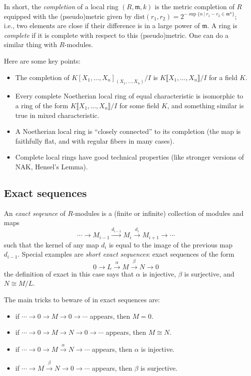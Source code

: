 \documentclass[12pt]{amsart}
\newcommand{\m}{\mathfrak{m}}
\begin{document}
In short, the \emph{completion} of a local ring $(R,\m,k)$ is the metric completion of $R$ equipped with the (pseudo)metric given by $\mathrm{dist}(r_1,r_2) = 2^{- \sup\{ n \ | \ r_1-r_2 \in \m^{n}\}}$; i.e., two elements are close if their difference is in a large power of $\m$. A ring is \emph{complete} if it is complete with respect to this (pseudo)metric. One can do a similar thing with $R$-modules.

Here are some key points:
\begin{itemize}
\item The completion of $K[X_1,\dots,X_n]_{(X_1,\dots,X_n)}/I$ is $K\llbracket X_1,\dots,X_n\rrbracket / I$ for a field $K$.
\item Every complete Noetherian local ring of equal characteristic is isomorphic to a ring of the form $K\llbracket X_1,\dots,X_n\rrbracket / I$ for some field $K$, and something similar is true in mixed characteristic.
\item A Noetherian local ring is ``closely connected'' to its completion (the map is faithfully flat, and with regular fibers in many cases).
\item Complete local rings have good technical properties (like stronger versions of NAK, Hensel's Lemma).
\end{itemize}



\subsection*{Exact sequences} An \emph{exact seqeunce} of $R$-modules is 
a (finite or infinite) collection of modules and maps
\[ \cdots  \rightarrow M_{i-1} \xrightarrow{d_{i-1}} M_{i} \xrightarrow{d_{i}} M_{i+1} \rightarrow \cdots\]
such that the kernel of any map $d_{i}$ is equal to the image of the previous map $d_{i-1}$. Special examples are \emph{short exact sequences}: exact sequences of the form
\[ 0  \rightarrow L \xrightarrow{\alpha} M \xrightarrow{\beta} N \rightarrow 0\]
the definition of exact in this case says that $\alpha$ is injective, $\beta$ is surjective, and $N\cong M/L$.

The main tricks to beware of in exact sequences are:
\begin{itemize}
\item if $\cdots \to  0 \to M \to 0 \to \cdots$ appears, then $M=0$.
\item if $\cdots \to  0 \to M \to N \to 0 \to \cdots$ appears, then $M\cong N$.
\item if $\cdots \to  0 \to M \xrightarrow{\alpha} N \to \cdots$ appears, then $\alpha$ is injective.
\item if $\cdots \to  M \xrightarrow{\beta} N \to 0 \to  \cdots$ appears, then $\beta$ is surjective.
\end{itemize}
\end{document}
